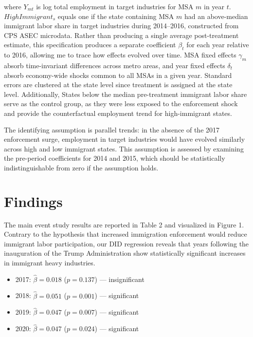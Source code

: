 \documentclass[12pt]{article}
\begin{document}
where $Y_{mt}$ is log total employment in target industries for MSA $m$ in year $t$. $HighImmigrant_s$ equals one if the state containing MSA $m$ had an above-median immigrant labor share in target industries during 2014--2016, constructed from CPS ASEC microdata. Rather than producing a single average post-treatment estimate, this specification produces a separate coefficient $\beta_t$ for each year relative to 2016, allowing me to trace how effects evolved over time. MSA fixed effects $\gamma_m$ absorb time-invariant differences across metro areas, and year fixed effects $\delta_t$ absorb economy-wide shocks common to all MSAs in a given year. Standard errors are clustered at the state level since treatment is assigned at the state level. Additionally, States below the median pre-treatment immigrant labor share serve as the control group, as they were less exposed to the enforcement shock and provide the counterfactual 
employment trend for high-immigrant states.

The identifying assumption is parallel trends: in the absence of the 2017 enforcement surge, employment in target industries would have evolved similarly across high and low immigrant states. This assumption is assessed by examining the pre-period coefficients for 2014 and 2015, which should be statistically indistinguishable from zero if the assumption holds.

 
\section{Findings}


The main event study results are reported in Table 2 and visualized in
Figure 1. Contrary to the hypothesis that increased immigration enforcement would reduce immigrant labor participation, our DID regression reveals that years following the inauguration of the Trump Administration show statistically significant increases in immigrant heavy industries. 
 
\begin{itemize}
    \item 2017: $\hat{\beta} = 0.018$ ($p = 0.137$) — insignificant
    \item 2018: $\hat{\beta} = 0.051$ ($p = 0.001$) — significant
    \item 2019: $\hat{\beta} = 0.047$ ($p = 0.007$) — significant
    \item 2020: $\hat{\beta} = 0.047$ ($p = 0.024$) — significant
\end{itemize}
 
\end{document}

